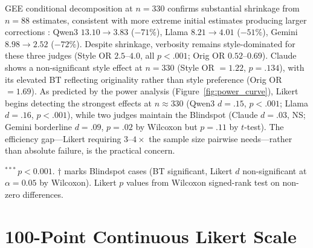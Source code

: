 GEE conditional decomposition at $n = 330$ confirms substantial shrinkage from $n = 88$ estimates, consistent with more extreme initial estimates producing larger corrections \citep{nemes2009bias}: Qwen3 $13.10 \to 3.83$ ($-71\%$), Llama $8.21 \to 4.01$ ($-51\%$), Gemini $8.98 \to 2.52$ ($-72\%$).
Despite shrinkage, verbosity remains style-dominated for these three judges (Style OR $2.5$--$4.0$, all $p < .001$; Orig OR $0.52$--$0.69$).
Claude shows a non-significant style effect at $n = 330$ (Style OR $= 1.22$, $p = .134$), with its elevated BT reflecting originality rather than style preference (Orig OR $= 1.69$).
As predicted by the power analysis (Figure~\ref{fig:power_curve}), Likert begins detecting the strongest effects at $n \approx 330$ (Qwen3 $d = .15$, $p < .001$; Llama $d = .16$, $p < .001$), while two judges maintain the Blindspot (Claude $d = .03$, NS; Gemini borderline $d = .09$, $p = .02$ by Wilcoxon but $p = .11$ by $t$-test).
The efficiency gap---Likert requiring $3$--$4\times$ the sample size pairwise needs---rather than absolute failure, is the practical concern.

\begin{table}[h]
\centering
\small
\caption{Verbosity scaled replication ($n = 330$, four judges; GPT-4o not re-scored). Blindspot partially resolves for strong effects (Qwen3, Llama-70B) but persists for weaker-effect judges (Gemini, Claude).}
\label{tab:verb_n355}
\par\vspace{2pt}
{\footnotesize $^{***}$\,$p < 0.001$. $\dagger$ marks Blindspot cases (BT significant, Likert $d$ non-significant at $\alpha = 0.05$ by Wilcoxon). Likert $p$ values from Wilcoxon signed-rank test on non-zero differences.}
\end{table}

\section{100-Point Continuous Likert Scale}
\label{app:likert100}

